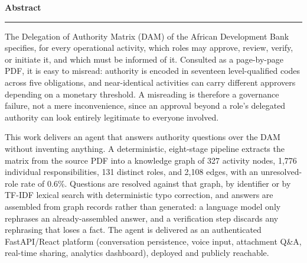 
\thispagestyle{empty}
\begin{singlespace}
\setlength{\parskip}{0pt}

\vspace*{0.1cm}

{\noindent\Large\sffamily\bfseries Abstract\par}

\vspace{0.12cm}
\noindent\textcolor{myblue}{\rule{\textwidth}{1.1pt}}

\vspace{0.2cm}

\noindent The Delegation of Authority Matrix (DAM) of the African Development Bank
specifies, for every operational activity, which roles may approve, review, verify, or
initiate it, and which must be informed of it. Consulted as a page-by-page PDF, it is
easy to misread: authority is encoded in seventeen level-qualified codes across five
obligations, and near-identical activities can carry different approvers depending on a
monetary threshold. A misreading is therefore a governance failure, not a mere
inconvenience, since an approval beyond a role's delegated authority can look entirely
legitimate to everyone involved.

\vspace{0.15cm}

\noindent This work delivers an agent that answers authority questions over the DAM
without inventing anything. A deterministic, eight-stage pipeline extracts the matrix
from the source PDF into a knowledge graph of 327 activity nodes, 1,776 individual
responsibilities, 131 distinct roles, and 2,108 edges, with an unresolved-role rate of
0.6\%. Questions are resolved against that graph, by identifier or by TF-IDF lexical
search with deterministic typo correction, and answers are assembled from graph records
rather than generated: a language model only rephrases an already-assembled answer, and a
verification step discards any rephrasing that loses a fact. The agent is delivered as
an authenticated FastAPI/React platform (conversation persistence, voice input,
attachment Q\&A, real-time sharing, analytics dashboard), deployed and publicly
reachable.


\end{singlespace}
